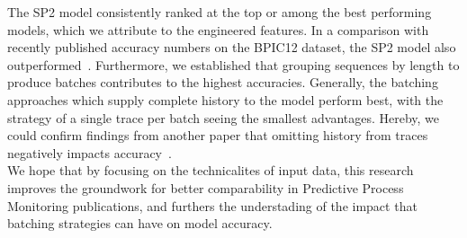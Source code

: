 The SP2 model consistently ranked at the top or among the best performing models, which we attribute to the engineered features. In a comparison with recently published accuracy numbers on the BPIC12 dataset, the SP2 model also outperformed~\cite{boehmer2018probability, evermann2016}. Furthermore, we established that grouping sequences by length to produce batches contributes to the highest accuracies. Generally, the batching approaches which supply complete history to the model perform best, with the strategy of a single trace per batch seeing the smallest advantages. Hereby, we could confirm findings from another paper that omitting history from traces negatively impacts accuracy~\cite{klinkmuller2018reliablemonitoring}.\\

We hope that by focusing on the technicalites of input data, this research improves the groundwork for better comparability in Predictive Process Monitoring publications, and furthers the understading of the impact that batching strategies can have on model accuracy.
